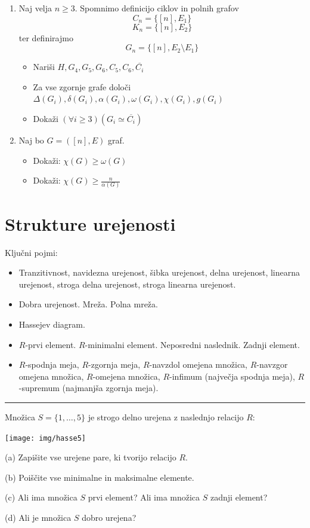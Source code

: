 \documentclass[11pt,paper=b5,footinclude,headinclude]{scrbook} %
\newtheorem{ex}{Vaja\hypertarget{sol:\theex}}[chapter]
\begin{document}
\begin{enumerate}
\item Naj velja $n\ge 3$. Spomnimo definicijo ciklov in polnih grafov
\[C_{n}=\{[n], E_{1}\}\]
\[K_{n}=\{[n], E_{2}\}\]
ter definirajmo 
\[G_{n}=\{[n], E_{2} \setminus E_{1}\}\]
\begin{itemize}
    \item Nariši \(H, G_{4}, G_{5}, G_{6}, C_{5}, C_{6}, \overline{C_{i}}\)
    \item Za  vse zgornje grafe določi \(\Delta(G_{i}), \delta(G_{i}), \alpha(G_{i}), \omega(G_{i}), \chi(G_{i}), g(G_{i})\)
    \item
Dokaži \((\forall i \geq 3) (G_{i} \simeq \overline{C_{i}})\)
\end{itemize}


\item
Naj bo \(G = ([n], E)\) graf.
\begin{itemize}
\item
Dokaži: \(\chi (G) \geq \omega (G)\)

\item
Dokaži: \(\chi (G) \geq \frac{n}{\alpha(G)}\)
\end{itemize}

\end{enumerate}


\section{Strukture urejenosti}
Ključni pojmi:
\begin{itemize}
\item Tranzitivnost, navidezna urejenost, šibka urejenost, delna urejenost,
linearna urejenost, stroga delna urejenost, stroga linearna urejenost.
\item Dobra urejenost. Mreža. Polna mreža.
\item Hassejev diagram.
\item $R$-prvi element. $R$-minimalni element. Neposredni naslednik. Zadnji element.
\item $R$-spodnja meja, $R$-zgornja meja, $R$-navzdol omejena množica, $R$-navzgor omejena
množica, $R$-omejena množica, $R$-infimum (največja spodnja meja),
$R$-supremum (najmanjša zgornja meja).
\end{itemize}
\hrule
\begin{ex}
Množica $S=\{1,\ldots,5\}$ je strogo delno urejena z naslednjo relacijo $R$:
\begin{center}
\texttt{[image: img/hasse5]}
\end{center}

(a) Zapišite vse urejene pare, ki tvorijo relacijo $R$.

(b) Poiščite vse minimalne in maksimalne elemente.

(c) Ali ima množica $S$ prvi element? Ali ima množica $S$ zadnji element?

(d) Ali je množica $S$ dobro urejena?
\end{ex}
\end{document}
